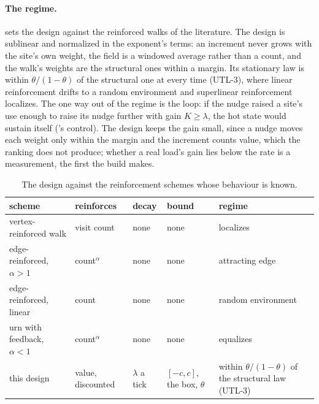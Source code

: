 \documentclass[11pt,a4paper]{article}
\theoremstyle{plain}
\theoremstyle{definition}
\begin{document}
\paragraph{The regime.}
 sets the design against the reinforced walks of the literature. The design is
sublinear and normalized in the exponent's terms: an increment never grows with the site's own
weight, the field is a windowed average rather than a count, and the walk's weights are the
structural ones within a margin. Its stationary law is within $\theta/(1-\theta)$ of the
structural one at every time (UTL-3), where linear reinforcement drifts to a random environment and
superlinear reinforcement localizes. The one way out of the regime is the loop: if the nudge raised
a site's use enough to raise its nudge further with gain $K \ge \lambda$, the hot state would
sustain itself ('s control). The design keeps the gain small, since a nudge moves
each weight only within the margin and the increment counts value, which the ranking does not
produce; whether a real load's gain lies below the rate is a measurement, the first the build
makes.

\begin{table}[ht]
\centering\footnotesize
\begin{tabular}{llllp{4.1cm}}
\toprule
scheme & reinforces & decay & bound & regime \\
\midrule
vertex-reinforced walk & visit count & none & none & localizes \cite{pemantle1992vrrw,tarres2004five,benaim2011dynamics} \\
edge-reinforced, $\alpha > 1$ & count$^{\alpha}$ & none & none & attracting edge \cite{davis1990reinforced,limic2007attracting} \\
edge-reinforced, linear & count & none & none & random environment \cite{diaconis1980definetti,sabot2015errw} \\
urn with feedback, $\alpha < 1$ & count$^{\alpha}$ & none & none & equalizes \cite{drinea2002feedback} \\
this design & value, discounted & $\lambda$ a tick & $[-c, c]$, the box, $\theta$ & within $\theta/(1-\theta)$ of the structural law (UTL-3) \\
\bottomrule
\end{tabular}
\caption{The design against the reinforcement schemes whose behaviour is known.}
\label{tab:regime}
\end{table}
\end{document}
